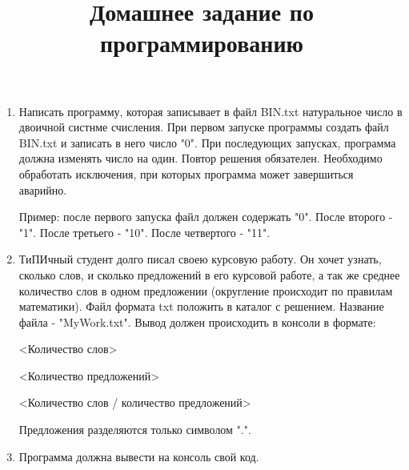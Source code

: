\documentclass[a4paper,12pt]{article} %
\author{}
\title{Домашнее задание по программированию}
\date{}
\begin{document}
	\maketitle
	\begin{enumerate}
		\item \noindent Написать программу, которая записывает в файл BIN.txt натуральное число в двоичной систнме счисления. При первом запуске программы создать файл BIN.txt и записать в него число "0". При последующих запусках, программа должна изменять число на один. Повтор решения обязателен. Необходимо обработать исключения, при которых программа может завершиться аварийно.
		
		Пример: после первого запуска файл должен содержать "0". После второго - "1". После третьего - "10". После четвертого - "11".
		
		\item  \noindent ТиПИчный студент долго писал своею курсовую работу. Он хочет узнать, сколько слов, и сколько предложений в его курсовой работе, а так же среднее количество слов в одном предложении (округление происходит по правилам математики). Файл формата txt положить в каталог с решением. Название файла - "MyWork.txt". Вывод должен происходить в консоли в формате:
		
		<Количество слов>
		
		<Количество предложений>
		
		<Количество слов / количество предложений> 
		
		Предложения разделяются только символом ".".
		
		\item Программа должна вывести на консоль свой код.
	\end{enumerate}
\end{document}
